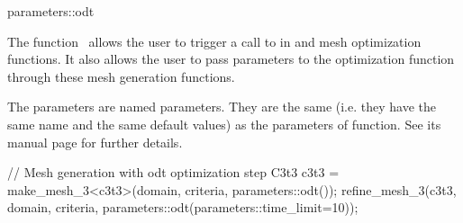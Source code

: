 \ccRefPageBegin


\begin{ccRefFunction}{parameters::odt}  %


\ccDefinition
  
The function \ccRefName\ allows the user to trigger a call to
 in
 and  mesh optimization functions. It also
allows the user to pass parameters to the optimization function 
 through these mesh generation functions.



\ccParameters

The parameters are named parameters. They are the same (i.e. they have the same
name and the same default values) as the parameters of 
function. See its manual page for further details.



\ccExample

\begin{ccExampleCode}
// Mesh generation with odt optimization step
C3t3 c3t3 = make_mesh_3<c3t3>(domain, criteria, parameters::odt());
refine_mesh_3(c3t3, domain, criteria, parameters::odt(parameters::time_limit=10));
\end{ccExampleCode}

\ccSeeAlso

 \\
 \\
 \\


\end{ccRefFunction}

\ccRefPageEnd

